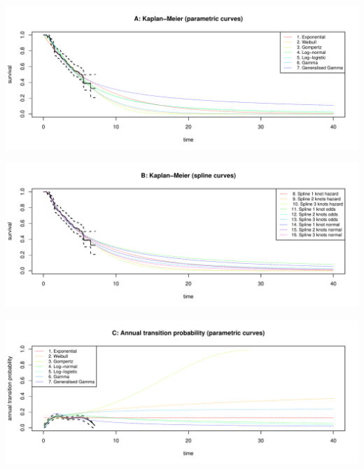 \documentclass[]{article}
\begin{document}
\begin{flushleft}\includegraphics[height=0.29\textheight]{Images/validate_extrapolation2-1} \end{flushleft}

\begin{flushleft}\includegraphics[height=0.29\textheight]{Images/validate_extrapolation2-2} \end{flushleft}

\begin{flushleft}\includegraphics[height=0.29\textheight]{Images/validate_extrapolation2-3} \end{flushleft}
\end{document}
